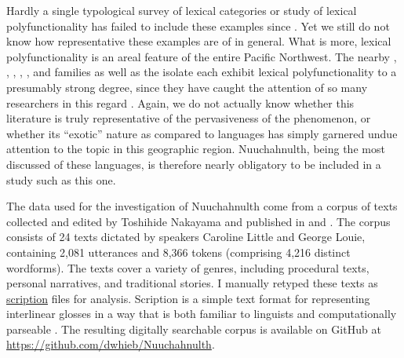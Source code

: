 Hardly a single typological survey of lexical categories or study of lexical polyfunctionality has failed to include these examples since . Yet we still do not know how representative these examples are of  in general. What is more, lexical polyfunctionality is an areal feature of the entire Pacific Northwest. The nearby , , , , , and  families as well as the isolate  each exhibit lexical polyfunctionality to a presumably strong degree, since they have caught the attention of so many researchers in this regard . Again, we do not actually know whether this literature is truly representative of the pervasiveness of the phenomenon, or whether its \enquote{exotic} nature as compared to  languages has simply garnered undue attention to the topic in this geographic region. Nuuchahnulth, being the most discussed of these languages, is therefore nearly obligatory to be included in a study such as this one.

The data used for the investigation of Nuuchahnulth come from a corpus of texts collected and edited by Toshihide Nakayama and published in \textcite{Little2003} and \textcite{Louie2003}. The corpus consists of 24 texts dictated by speakers Caroline Little and George Louie, containing 2,081 utterances and 8,366 tokens (comprising 4,216 distinct wordforms). The texts cover a variety of genres, including procedural texts, personal narratives, and traditional stories. I manually retyped these texts as \href{https://scription.digitallinguistics.io}{scription} files for analysis. Scription is a simple text format for representing interlinear glosses in a way that is both familiar to linguists and computationally parseable \parencite{Hieber2021b}. The resulting digitally searchable corpus is available on GitHub at \url{https://github.com/dwhieb/Nuuchahnulth}.

